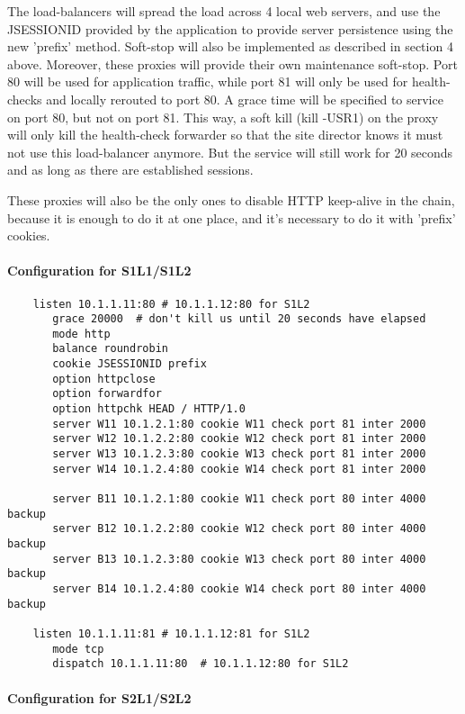 The load-balancers will spread the load across 4 local web servers, and
use the JSESSIONID provided by the application to provide server persistence
using the new 'prefix' method. Soft-stop will also be implemented as described
in section 4 above. Moreover, these proxies will provide their own maintenance
soft-stop. Port 80 will be used for application traffic, while port 81 will
only be used for health-checks and locally rerouted to port 80. A grace time
will be specified to service on port 80, but not on port 81. This way, a soft
kill (kill -USR1) on the proxy will only kill the health-check forwarder so
that the site director knows it must not use this load-balancer anymore. But
the service will still work for 20 seconds and as long as there are established
sessions.

These proxies will also be the only ones to disable HTTP keep-alive in the
chain, because it is enough to do it at one place, and it's necessary to do
it with 'prefix' cookies.

\paragraph{Configuration for S1L1/S1L2}

\begin{verbatim}
    listen 10.1.1.11:80 # 10.1.1.12:80 for S1L2
       grace 20000  # don't kill us until 20 seconds have elapsed
       mode http
       balance roundrobin
       cookie JSESSIONID prefix
       option httpclose
       option forwardfor
       option httpchk HEAD / HTTP/1.0
       server W11 10.1.2.1:80 cookie W11 check port 81 inter 2000
       server W12 10.1.2.2:80 cookie W12 check port 81 inter 2000
       server W13 10.1.2.3:80 cookie W13 check port 81 inter 2000
       server W14 10.1.2.4:80 cookie W14 check port 81 inter 2000

       server B11 10.1.2.1:80 cookie W11 check port 80 inter 4000 backup
       server B12 10.1.2.2:80 cookie W12 check port 80 inter 4000 backup
       server B13 10.1.2.3:80 cookie W13 check port 80 inter 4000 backup
       server B14 10.1.2.4:80 cookie W14 check port 80 inter 4000 backup

    listen 10.1.1.11:81 # 10.1.1.12:81 for S1L2
       mode tcp
       dispatch 10.1.1.11:80  # 10.1.1.12:80 for S1L2
\end{verbatim}

\paragraph{Configuration for S2L1/S2L2}

